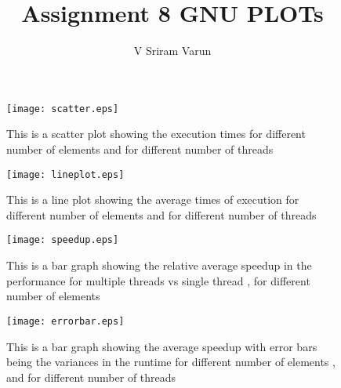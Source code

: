 \documentclass[a4paper, 10pt]{report}
\title{Assignment 8 GNU PLOTs}
\author{V Sriram Varun}
\date{}
\begin{document}
\maketitle


\begin{figure}
\centering
\texttt{[image: scatter.eps]}
 \caption{This is a scatter plot showing the execution times for different number of elements and for different number of threads}
 \label{fig:scatter}
\end{figure}


\begin{figure}
\centering
\texttt{[image: lineplot.eps]}
 \caption{This is a line plot showing the average times of execution for different number of elements and for different number of threads}
 \label{fig:lineplot}
\end{figure}

\begin{figure}
\centering
\texttt{[image: speedup.eps]}
 \caption{This is a bar graph showing the relative average speedup in the performance for multiple threads vs single thread , for different number of elements}
 \label{fig:speedup}
\end{figure}

\begin{figure}
\centering
\texttt{[image: errorbar.eps]}
 \caption{This is a bar graph showing the average speedup with error bars being the variances in the runtime for different number of elements , and for different number of threads}
 \label{fig:errorbar}
\end{figure}
\end{document}
